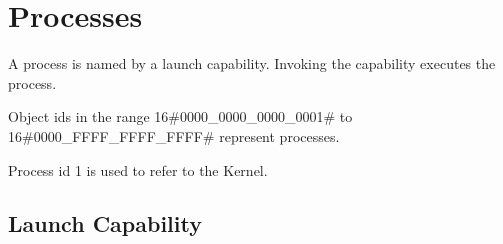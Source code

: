 \chapter{Processes}

A process is named by a launch capability.  Invoking the capability executes the process.

Object ids in the range 16\#0000\_0000\_0000\_0001\# to 16\#0000\_FFFF\_FFFF\_FFFF\# represent processes.

Process id 1 is used to refer to the Kernel.

\section{Launch Capability}


